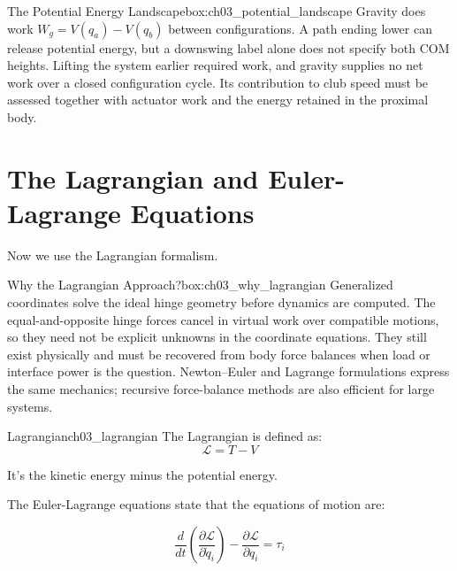 \begin{laymansbox}{The Potential Energy Landscape}{box:ch03_potential_landscape}
Gravity does work $W_g=V(q_a)-V(q_b)$ between configurations. A path ending lower can release potential energy, but a downswing label alone does not specify both COM heights. Lifting the system earlier required work, and gravity supplies no net work over a closed configuration cycle. Its contribution to club speed must be assessed together with actuator work and the energy retained in the proximal body.
\end{laymansbox}

\section{The Lagrangian and Euler-Lagrange Equations}

Now we use the Lagrangian formalism.


\begin{laymansbox}{Why the Lagrangian Approach?}{box:ch03_why_lagrangian}
Generalized coordinates solve the ideal hinge geometry before dynamics are computed. The equal-and-opposite hinge forces cancel in virtual work over compatible motions, so they need not be explicit unknowns in the coordinate equations. They still exist physically and must be recovered from body force balances when load or interface power is the question. Newton--Euler and Lagrange formulations express the same mechanics; recursive force-balance methods are also efficient for large systems.
\end{laymansbox}

\begin{definition}{Lagrangian}{ch03_lagrangian}
The Lagrangian is defined as:
\begin{equation}
\mathcal{L} = T - V
\label{eq:ch03_lagrangian_def}
\end{equation}

It's the kinetic energy minus the potential energy.
\end{definition}

The Euler-Lagrange equations state that the equations of motion are:

\begin{equation}
\frac{d}{dt} \left( \frac{\partial \mathcal{L}}{\partial \dot{q}_i} \right) - \frac{\partial \mathcal{L}}{\partial q_i} = \tau_i
\label{eq:ch03_euler_lagrange}
\end{equation}

